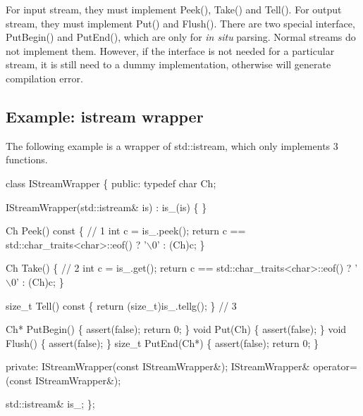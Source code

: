 For input stream, they must implement {\ttfamily Peek()}, {\ttfamily Take()} and {\ttfamily Tell()}. For output stream, they must implement {\ttfamily Put()} and {\ttfamily Flush()}. There are two special interface, {\ttfamily Put\+Begin()} and {\ttfamily Put\+End()}, which are only for {\itshape in situ} parsing. Normal streams do not implement them. However, if the interface is not needed for a particular stream, it is still need to a dummy implementation, otherwise will generate compilation error.\hypertarget{md_Commun_Externe_RapidJSON_doc_stream.zh-cn_ExampleIStreamWrapper}{}\subsection{Example\+: istream wrapper}\label{md_Commun_Externe_RapidJSON_doc_stream.zh-cn_ExampleIStreamWrapper}
The following example is a wrapper of {\ttfamily std\+::istream}, which only implements 3 functions.


\begin{DoxyCode}
\textcolor{keyword}{class }IStreamWrapper \{
\textcolor{keyword}{public}:
    \textcolor{keyword}{typedef} \textcolor{keywordtype}{char} Ch;

    IStreamWrapper(std::istream& is) : is\_(is) \{
    \}

    Ch Peek()\textcolor{keyword}{ const }\{ \textcolor{comment}{// 1}
        \textcolor{keywordtype}{int} c = is\_.peek();
        \textcolor{keywordflow}{return} c == std::char\_traits<char>::eof() ? \textcolor{charliteral}{'\(\backslash\)0'} : (Ch)c;
    \}

    Ch Take() \{ \textcolor{comment}{// 2}
        \textcolor{keywordtype}{int} c = is\_.get();
        \textcolor{keywordflow}{return} c == std::char\_traits<char>::eof() ? \textcolor{charliteral}{'\(\backslash\)0'} : (Ch)c;
    \}

    \textcolor{keywordtype}{size\_t} Tell()\textcolor{keyword}{ const }\{ \textcolor{keywordflow}{return} (\textcolor{keywordtype}{size\_t})is\_.tellg(); \} \textcolor{comment}{// 3}

    Ch* PutBegin() \{ assert(\textcolor{keyword}{false}); \textcolor{keywordflow}{return} 0; \}
    \textcolor{keywordtype}{void} Put(Ch) \{ assert(\textcolor{keyword}{false}); \}
    \textcolor{keywordtype}{void} Flush() \{ assert(\textcolor{keyword}{false}); \}
    \textcolor{keywordtype}{size\_t} PutEnd(Ch*) \{ assert(\textcolor{keyword}{false}); \textcolor{keywordflow}{return} 0; \}

\textcolor{keyword}{private}:
    IStreamWrapper(\textcolor{keyword}{const} IStreamWrapper&);
    IStreamWrapper& operator=(\textcolor{keyword}{const} IStreamWrapper&);

    std::istream& is\_;
\};
\end{DoxyCode}


